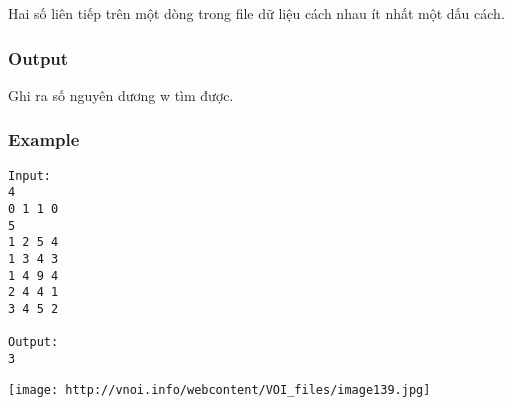 Hai số liên tiếp trên một dòng trong file dữ liệu cách nhau ít nhất một dấu cách.

\subsubsection{Output}

Ghi ra số nguyên dương w tìm được.

\subsubsection{Example}
\begin{verbatim}
Input:
4
0 1 1 0
5
1 2 5 4
1 3 4 3
1 4 9 4
2 4 4 1
3 4 5 2

Output:
3

\end{verbatim}


\texttt{[image: http://vnoi.info/webcontent/VOI\_files/image139.jpg]}

